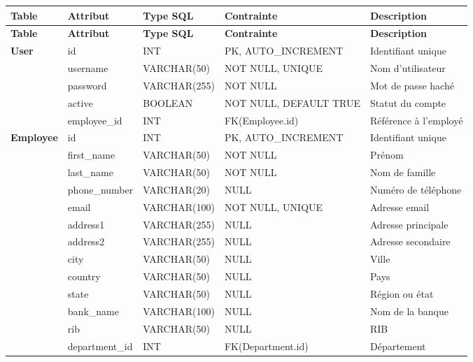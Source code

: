 \renewcommand{\arraystretch}{1.3} %

\begin{longtable}{|p{2.5cm}|p{3cm}|p{3cm}|p{3cm}|p{3cm}|}
    \hline
    \textbf{Table} & \textbf{Attribut} & \textbf{Type SQL} & \textbf{Contrainte} & \textbf{Description} \\
    \hline
    \endfirsthead

    \hline
    \textbf{Table} & \textbf{Attribut} & \textbf{Type SQL} & \textbf{Contrainte} & \textbf{Description} \\
    \hline
    \endhead

    \multirow{5}{*}{\textbf{User}} & id & INT & PK, AUTO\_INCREMENT & Identifiant unique \\
    \cline{2-5}
    & username & VARCHAR(50) & NOT NULL, UNIQUE & Nom d'utilisateur \\
    \cline{2-5}
    & password & VARCHAR(255) & NOT NULL & Mot de passe haché \\
    \cline{2-5}
    & active & BOOLEAN & NOT NULL, DEFAULT TRUE & Statut du compte \\
    \cline{2-5}
    & employee\_id & INT & FK(Employee.id) & Référence à l'employé \\
    \hline

    \multirow{12}{*}{\textbf{Employee}} & id & INT & PK, AUTO\_INCREMENT & Identifiant unique \\
    \cline{2-5}
    & first\_name & VARCHAR(50) & NOT NULL & Prénom \\
    \cline{2-5}
    & last\_name & VARCHAR(50) & NOT NULL & Nom de famille \\
    \cline{2-5}
    & phone\_number & VARCHAR(20) & NULL & Numéro de téléphone \\
    \cline{2-5}
    & email & VARCHAR(100) & NOT NULL, UNIQUE & Adresse email \\
    \cline{2-5}
    & address1 & VARCHAR(255) & NULL & Adresse principale \\
    \cline{2-5}
    & address2 & VARCHAR(255) & NULL & Adresse secondaire \\
    \cline{2-5}
    & city & VARCHAR(50) & NULL & Ville \\
    \cline{2-5}
    & country & VARCHAR(50) & NULL & Pays \\
    \cline{2-5}
    & state & VARCHAR(50) & NULL & Région ou état \\
    \cline{2-5}
    & bank\_name & VARCHAR(100) & NULL & Nom de la banque \\
    \cline{2-5}
    & rib & VARCHAR(50) & NULL & RIB \\
    \cline{2-5}
    & department\_id & INT & FK(Department.id) & Département \\
    \hline


\end{longtable}
